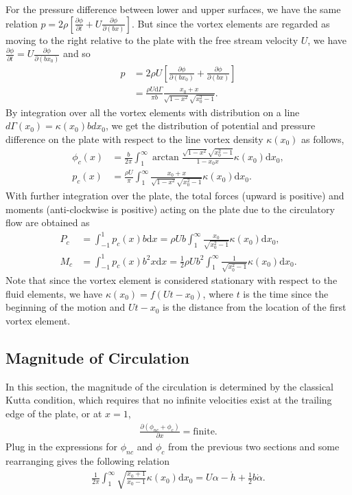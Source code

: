 For the pressure difference between lower and upper surfaces, we have the same relation $p = 2 \rho[\frac{\partial \phi}{\partial t} + U\frac{\partial \phi}{\partial (bx)}]$.
But since the vortex elements are regarded as moving to the right relative to the plate with the free stream velocity $U$,  we have $\frac{\partial \phi}{\partial t} = U\frac{\partial \phi}{\partial (bx_0)}$ and so 
\begin{align}
p & = 2\rho U [\frac{\partial \phi}{\partial (bx_0)} + \frac{\partial \phi}{\partial (bx)}]  \\
   & =  \frac{\rho U \mathrm{d}\Gamma}{\pi b} \frac{x_0+x}{\sqrt{1-x^2}\sqrt{x_0^2-1}}.
\end{align}
By integration over all the vortex elements with distribution on a line $d\Gamma(x_0) = \kappa(x_0)bdx_0$, we get the distribution of potential and pressure difference on the plate with respect to the line vortex density $\kappa(x_0)$ as follows,
\begin{align}
\phi_c(x) & =  \frac{b}{2\pi} \int_{1}^{\infty}\arctan \frac{\sqrt{1-x^2}\sqrt{x_0^2-1}}{1-x_0x} \kappa(x_0) \mathrm{d}x_0, \\
p_c(x) &  =  \frac{\rho U}{\pi} \int_{1}^{\infty}\frac{x_0+x}{\sqrt{1-x^2}\sqrt{x_0^2-1}} \kappa(x_0) \mathrm{d}x_0.
\end{align}
With further integration over the plate, the total forces (upward is positive) and moments (anti-clockwise is positive) acting on the plate due to the circulatory flow are obtained as
\begin{align}
P_c & =  \int_{-1}^{1} p_c (x) b \mathrm{d}x
   =  \rho U b \int_{1}^{\infty} \frac{x_0}{\sqrt{x_0^2-1}} \kappa(x_0) \mathrm{d}x_0, \\
M_c & =  \int_{-1}^{1} p_c (x) b^2 x \mathrm{d}x
   =   \frac{1}{2} \rho U b^2 \int_{1}^{\infty} \frac{1}{\sqrt{x_0^2-1}} \kappa(x_0) \mathrm{d}x_0.
\end{align}
Note that since the vortex element is considered stationary with respect to the fluid elements, we have $\kappa (x_0) = f(Ut - x_0)$, where $t$ is the time since the beginning of the motion and $Ut-x_0$ is the distance from the location of the first vortex element.


\subsection{Magnitude of Circulation}

In this section, the magnitude of the circulation is determined by the classical Kutta condition, which requires that no infinite velocities exist at the trailing edge of the plate, or at $x = 1$,
\begin{align}
\frac{\partial (\phi_{nc} + \phi_c)}{\partial x} = \text{finite}.
\end{align}
Plug in the expressions for $\phi_{nc}$ and $\phi_c$ from the previous two sections and some rearranging gives the following relation
\begin{align}       \label{eqn:Kutta}
\frac{1}{2\pi} \int_{1}^{\infty} \sqrt{\frac{x_0+1}{x_0-1}} \kappa(x_0) \mathrm{d}x_0 = U \alpha - \dot{h} + \frac{1}{2}b\dot{\alpha}.
\end{align}

